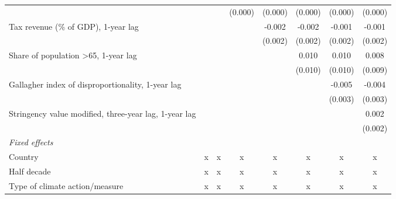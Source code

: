\begin{tabular}{lccccccc}
                                                                 &                &                & (0.000)        & (0.000)       & (0.000)       & (0.000)       & (0.000)\\   
   Tax revenue (\% of GDP), 1-year lag                           &                &                &                & -0.002        & -0.002        & -0.001        & -0.001\\   
                                                                 &                &                &                & (0.002)       & (0.002)       & (0.002)       & (0.002)\\   
   Share of population >65, 1-year lag                           &                &                &                &               & 0.010         & 0.010         & 0.008\\   
                                                                 &                &                &                &               & (0.010)       & (0.010)       & (0.009)\\   
   Gallagher index of disproportionality, 1-year lag             &                &                &                &               &               & -0.005        & -0.004\\   
                                                                 &                &                &                &               &               & (0.003)       & (0.003)\\   
   Stringency value modified, three-year lag, 1-year lag         &                &                &                &               &               &               & 0.002\\   
                                                                 &                &                &                &               &               &               & (0.002)\\   
   \emph{Fixed effects}\\
   Country                                                       & x              & x              & x              & x             & x             & x             & x\\  
   Half decade                                                   & x              & x              & x              & x             & x             & x             & x\\  
   Type of climate action/measure                                & x              & x              & x              & x             & x             & x             & x\\  

\end{tabular}
